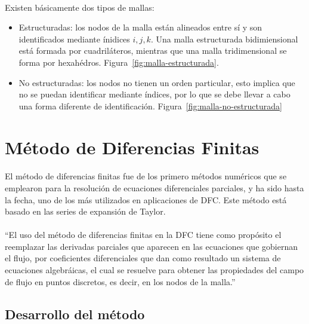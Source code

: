 \documentclass[letterpaper, openright, 12pt]{book}
\begin{document}
    \paragraph*{}
    Existen básicamente dos tipos de mallas:
    \begin{itemize}
    \item Estructuradas: los nodos de la malla están alineados entre sí y
      son identificados mediante ínidices $i, j, k$. Una malla estructurada
      bidimiensional está formada por cuadriláteros, mientras que una malla
      tridimensional se forma por hexahédros.
            Figura~\ref{fig:malla-estructurada}.
    \item No estructuradas: los nodos no tienen un orden particular, esto
      implica que no se puedan identificar mediante índices, por lo que se debe
      llevar a cabo una forma diferente de identificación.
            Figura~\ref{fig:malla-no-estructurada}
    \end{itemize}


    \section{Método de Diferencias Finitas}
    \paragraph*{}
    El método de diferencias finitas fue de los primero métodos numéricos
    que se emplearon para la resolución de ecuaciones diferenciales
    parciales, y ha sido hasta la fecha, uno de los más utilizados en
    aplicaciones de DFC\@. Este método está basado en las series de expansión
    de Taylor.

    \paragraph*{}
    ``El uso del método de diferencias finitas en la DFC tiene como propósito el
    reemplazar las derivadas parciales que aparecen en las ecuaciones que
    gobiernan el flujo, por coeficientes diferenciales que dan como resultado un
    sistema de ecuaciones algebráicas, el cual se resuelve para obtener las
    propiedades del campo de flujo en puntos discretos, es decir, en los nodos
    de la malla.'' \cite{anderson-yotros}

    \subsection{Desarrollo del método}
\end{document}

